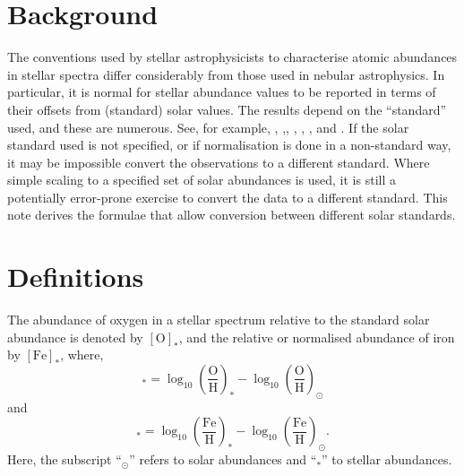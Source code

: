 \section{Background}

The conventions used by stellar astrophysicists to characterise atomic abundances in stellar spectra differ considerably from those used in nebular astrophysics.  In particular, it is normal for stellar abundance values to be reported in terms of their offsets from (standard) solar values. The results depend on the ``standard'' used, and these are numerous. See, for example, \cite{1989GeCoA..53..197A}, \cite{1998SSRv...85..161G},\cite{2007SSRv..130..105G}, \cite{2009ARA&A..47..481A}, \cite{2010Ap&SS.328..179G}, \cite{2015A&A...573A..25S}, \cite{2015A&A...573A..26S} and \cite{2015A&A...573A..27G}.  If the solar standard used is not specified, or if normalisation is done in a non-standard way, it may be impossible convert the observations to a different standard. Where simple scaling to a specified set of solar abundances is used, it is still a potentially error-prone exercise to convert the data to a different standard. This note derives the formulae that allow conversion between different solar standards.
  
\section{Definitions}
The abundance of oxygen in a stellar spectrum relative to the standard solar abundance is denoted by $[\text{O}]_*$, and the relative or normalised abundance of iron by $[\text{Fe}]_*$, where,
\begin{equation}
[\text{O}]_* = \log_{10}\left(\frac{\text{O}}{\text{H}}\right)_* - \log_{10}\left(\frac{\text{O}}{\text{H}}\right)_\odot
\end{equation}
and
\begin{equation}
[\text{Fe}]_* = \log_{10}\left(\frac{\text{Fe}}{\text{H}}\right)_* - \log_{10}\left(\frac{\text{Fe}}{\text{H}}\right)_\odot .
\end{equation}
Here, the subscript ``$_\odot$'' refers to solar abundances and ``$_*$'' to stellar abundances.

